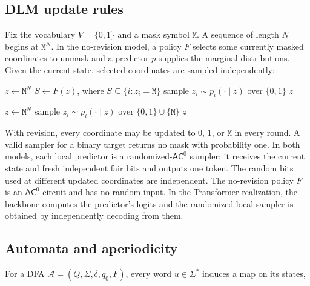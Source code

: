 \documentclass[10pt]{article}
\theoremstyle{definition}
\newcommand{\AC}{\mathsf{AC}}
\newcommand{\bits}{\{0,1\}}
\newcommand{\mask}{\mathtt{M}}
\begin{document}
\subsection{DLM update rules}

Fix the vocabulary $V=\bits$ and a mask symbol $\mask$.  A sequence of length
$N$ begins at $\mask^N$.  In the no-revision model, a policy $F$ selects some
currently masked coordinates to unmask and a predictor $p$ supplies the
marginal distributions.  Given the current state, selected coordinates are
sampled independently:

\begin{algorithm}[ht]
\caption{No-revision DLM}
\label{alg:norevision}
\begin{algorithmic}[1]
\State $z\gets \mask^N$
  \State $S\gets F(z)$, where $S\subseteq\{i:z_i=\mask\}$
    \State sample $z_i\sim p_i(\cdot\mid z)$ over $\bits$
  \EndFor
\EndFor
\State \Return $z$
\end{algorithmic}
\end{algorithm}

\begin{algorithm}[ht]
\caption{DLM with revision}
\label{alg:revision}
\begin{algorithmic}[1]
\State $z\gets \mask^N$
    \State sample $z_i\sim p_i(\cdot\mid z)$ over $\bits\cup\{\mask\}$
  \EndFor
\EndFor
\State \Return $z$
\end{algorithmic}
\end{algorithm}

With revision, every coordinate may be updated to $0$, $1$, or $\mask$ in
every round.  A valid sampler for a binary target returns no mask with
probability one.  In both models, each local predictor is a
randomized-$\AC^0$ sampler: it receives the current state and fresh independent
fair bits and outputs one token.  The random bits used at different updated
coordinates are independent.  The no-revision policy $F$ is an $\AC^0$
circuit and has no random input.  In the Transformer realization, the
backbone computes the predictor's logits and the randomized local sampler is
obtained by independently decoding from them.

\subsection{Automata and aperiodicity}

For a DFA $\mathcal A=(Q,\Sigma,\delta,q_0,F)$, every word $u\in\Sigma^*$
induces a map on its states,
\end{document}
